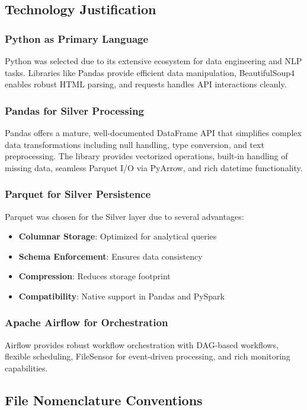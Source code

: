 \documentclass[11pt,a4paper]{article}
\begin{document}
\subsection{Technology Justification}

\subsubsection{Python as Primary Language}
Python was selected due to its extensive ecosystem for data engineering and NLP tasks. Libraries like Pandas provide efficient data manipulation, BeautifulSoup4 enables robust HTML parsing, and requests handles API interactions cleanly.

\subsubsection{Pandas for Silver Processing}
Pandas offers a mature, well-documented DataFrame API that simplifies complex data transformations including null handling, type conversion, and text preprocessing. The library provides vectorized operations, built-in handling of missing data, seamless Parquet I/O via PyArrow, and rich datetime functionality.

\subsubsection{Parquet for Silver Persistence}
Parquet was chosen for the Silver layer due to several advantages:
\begin{itemize}
    \item \textbf{Columnar Storage}: Optimized for analytical queries
    \item \textbf{Schema Enforcement}: Ensures data consistency
    \item \textbf{Compression}: Reduces storage footprint
    \item \textbf{Compatibility}: Native support in Pandas and PySpark
\end{itemize}

\subsubsection{Apache Airflow for Orchestration}
Airflow provides robust workflow orchestration with DAG-based workflows, flexible scheduling, FileSensor for event-driven processing, and rich monitoring capabilities.

\subsection{File Nomenclature Conventions}
\end{document}

